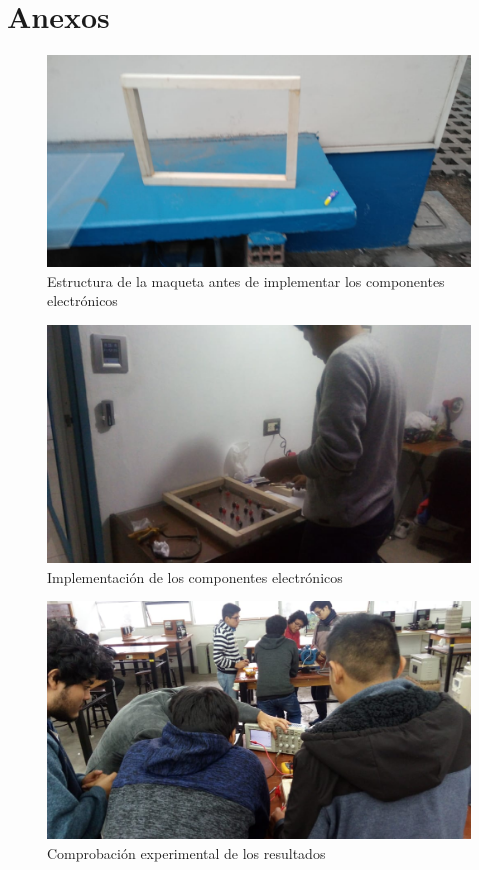 \documentclass[a4paper,12pt]{report}
\begin{document}
\chapter*{Anexos}
\begin{figure}[H]
\begin{center}
\includegraphics[scale=0.34]{mak.jpeg}
\caption[Maqueta]{Estructura de la maqueta antes de implementar los componentes electrónicos}
\end{center}
\end{figure}
\begin{figure}[H]
\begin{center}
\includegraphics[scale=0.38]{kesk.jpeg}
\caption[Implementación de los componentes electrónicos]{Implementación de los componentes electrónicos}
\end{center}
\end{figure}
\begin{figure}[H]
\begin{center}
\includegraphics[scale=0.4]{iyo.jpeg}
\caption{Comprobación experimental de los resultados}
\end{center}
\end{figure}
\end{document}

